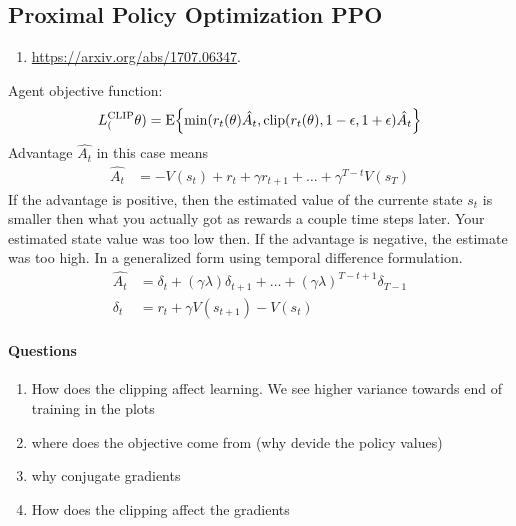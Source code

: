 \subsection{Proximal Policy Optimization PPO}
\newcommand{\oldpolicy}[2]{\pi_{\theta_{\mathrm{old}}} ( {#1} | {#2})}
\begin{enumerate}
	\item \url{https://arxiv.org/abs/1707.06347}. 
\end{enumerate}
Agent objective function:
\begin{align}
	L^{\mathrm{CLIP}}_( \theta) 
	= \mathrm{E}\!\left\{{
		\min(r_t(\theta) \hat{A_t}, \mathrm{clip}(r_t(\theta), 1-\epsilon, 1+\epsilon) \hat{A_t}
	}\right\}
\end{align}
Advantage $\hat{A_t}$ in this case means
\begin{align}
	\hat{A_t} &= -V(s_t) + r_t + \gamma r_{t+1} + \dots + \gamma^{T-t}V(s_T)
\end{align}
If the advantage is positive, then the estimated value of the currente state $s_t$ is smaller then what you actually got
as rewards a couple time steps later. Your estimated state value was too low then.
If the advantage is negative, the estimate was too high.
In a generalized form using temporal difference formulation.
\begin{align}
	\hat{A_t} &= \delta_t + (\gamma \lambda)\delta_{t+1} + \dots + (\gamma\lambda)^{T-t+1}\delta_{T-1} \\
	\delta_t &= r_t + \gamma V(s_{t+1}) - V(s_t)
\end{align}



\paragraph{Questions}
\begin{enumerate}
	\item How does the clipping affect learning. We see higher variance towards end of training in the plots
	\item where does the objective come from (why devide the policy values)
	\item why conjugate gradients
	\item How does the clipping affect the gradients
\end{enumerate}
